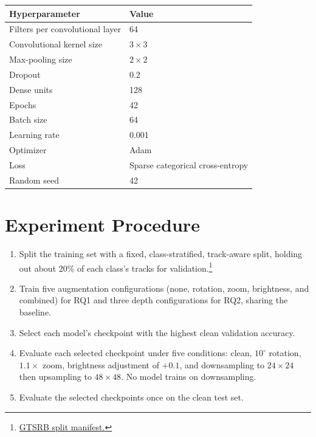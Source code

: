 \documentclass[11pt,letterpaper]{article}
\begin{document}
\begin{center}
\begin{tabular*}{\textwidth}{@{\extracolsep{\fill}}ll@{}}
\toprule
\textbf{Hyperparameter} & \textbf{Value} \\
\midrule
Filters per convolutional layer & 64 \\
Convolutional kernel size & $3 \times 3$ \\
Max-pooling size & $2 \times 2$ \\
Dropout & 0.2 \\
Dense units & 128 \\
Epochs & 42 \\
Batch size & 64 \\
Learning rate & 0.001 \\
Optimizer & Adam \\
Loss & Sparse categorical cross-entropy \\
Random seed & 42 \\
\bottomrule
\end{tabular*}
\end{center}

\section*{Experiment Procedure}

\begin{enumerate}
    \item Split the training set with a fixed, class-stratified, track-aware split, holding out about 20\% of each class's tracks for validation.\footnote{
        \href{https://github.com/joolaoye/csci441-project/blob/main/configs/splits/gtsrb_v1.json}
        {GTSRB split manifest.}
    }

    \item Train five augmentation configurations (none, rotation, zoom, brightness, and combined) for RQ1 and three depth configurations for RQ2, sharing the baseline.

    \item Select each model's checkpoint with the highest clean validation accuracy.

    \item Evaluate each selected checkpoint under five conditions: clean, $10^\circ$ rotation, $1.1\times$ zoom, brightness adjustment of $+0.1$, and downsampling to $24 \times 24$  then upsampling to $48 \times 48$.
    No model trains on downsampling.

    \item Evaluate the selected checkpoints once on the clean test set.
\end{enumerate}
\end{document}
